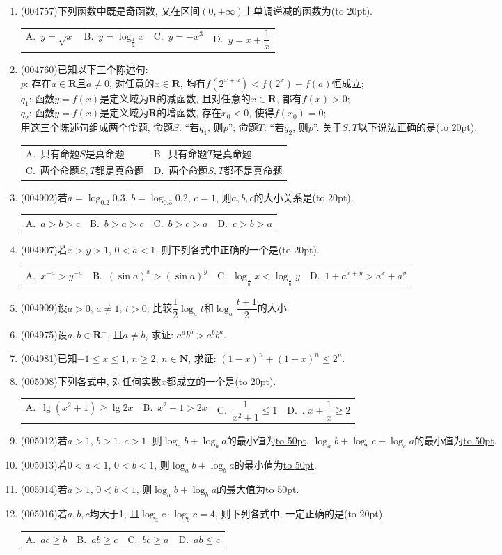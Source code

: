 \documentclass[10pt,a4paper]{article}
\newcommand{\blank}[1]{\underline{\hbox to #1pt{}}}
\newcommand{\bracket}[1]{(\hbox to #1pt{})}
\newcommand{\twoch}[4]{\par\begin{tabular}{p{.46\textwidth}p{.46\textwidth}}
A.~#1& B.~#2\\
C.~#3& D.~#4
\end{tabular}}
\newcommand{\fourch}[4]{\par\begin{tabular}{p{.23\textwidth}p{.23\textwidth}p{.23\textwidth}p{.23\textwidth}}
A.~#1 &B.~#2& C.~#3& D.~#4
\end{tabular}}
\begin{document}
\begin{enumerate}[1.]
\item {\tiny (004757)}下列函数中既是奇函数, 又在区间$(0,+\infty)$上单调递减的函数为\bracket{20}.
\fourch{$y=\sqrt x$}{$y=\log_{\frac 12}x$}{$y=-x^3$}{$y=x+\dfrac 1x$}
\item {\tiny (004760)}已知以下三个陈述句:\\
$p$: 存在$a\in \mathbf{R}$且$a\ne 0$, 对任意的$x\in \mathbf{R}$, 均有$f(2^{x+a})<f(2^x)+f(a)$恒成立;\\
$q_1$: 函数$y=f(x)$是定义域为$\mathbf{R}$的减函数, 且对任意的$x\in \mathbf{R}$, 都有$f(x)>0$;\\
$q_2$: 函数$y=f(x)$是定义域为$\mathbf{R}$的增函数, 存在$x_0<0$, 使得$f(x_0)=0$;\\
用这三个陈述句组成两个命题, 命题$S$: ``若$q_1$, 则$p$''; 命题$T$: ``若$q_2$, 则$p$''. 关于$S,T$以下说法正确的是\bracket{20}.
\twoch{只有命题$S$是真命题}{只有命题$T$是真命题}{两个命题$S,T$都是真命题}{两个命题$S,T$都不是真命题}
\item {\tiny (004902)}若$a=\log_{0.2}0.3$, $b=\log_{0.3}0.2$, $c=1$, 则$a,b,c$的大小关系是\bracket{20}.
\fourch{$a>b>c$}{$b>a>c$}{$b>c>a$}{$c>b>a$}
\item {\tiny (004907)}若$x>y>1$, $0<a<1$, 则下列各式中正确的一个是\bracket{20}.
\fourch{${x^{-a}}>{y^{-a}}$}{$(\sin a)^x>(\sin a)^y$}{$\log_{\frac 1a}x<\log_{\frac 1a}y$}{$1+a^{x+y}>a^x+a^y$}
\item {\tiny (004909)}设$a>0$, $a\ne 1$, $t>0$, 比较$\dfrac 12\log_at$和$\log_a\dfrac{t+1}2$的大小.
\item {\tiny (004975)}设$a,b\in \mathbf{R}^+$, 且$a\ne b$, 求证: $a^ab^b>a^bb^a$.
\item {\tiny (004981)}已知$-1\le x\le 1$, $n\ge 2$, $n\in \mathbf{N}$, 求证: $(1-x)^n+(1+x)^n\le 2^n$.
\item {\tiny (005008)}下列各式中, 对任何实数$x$都成立的一个是\bracket{20}.
\fourch{$\lg (x^2+1)\ge \lg 2x$}{$x^2+1>2x$}{$\dfrac 1{x^2+1}\le 1$}{. $x+\dfrac 1x\ge 2$}
\item {\tiny (005012)}若$a>1$, $b>1$, $c>1$, 则$\log_ab+\log_ba$的最小值为\blank{50}, $\log_ab+\log_bc+\log_ca$的最小值为\blank{50}.
\item {\tiny (005013)}若$0<a<1$, $0<b<1$, 则$\log_ab+\log_ba$的最小值为\blank{50}.
\item {\tiny (005014)}若$a>1$, $0<b<1$, 则$\log_ab+\log_ba$的最大值为\blank{50}.
\item {\tiny (005016)}若$a,b,c$均大于1, 且$\log_ac\cdot \log_bc=4$, 则下列各式中, 一定正确的是\bracket{20}.
\fourch{$ac\ge b$}{$ab\ge c$}{$bc\ge a$}{$ab\le c$}

\end{enumerate}
\end{document}
